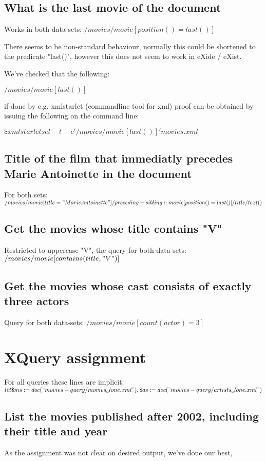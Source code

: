\subsection{What is the last movie of the document}
Works in both data-sets:
$/movies/movie[position()=last()]$

There seems to be non-standard behaviour, normally this could be
shortened to the predicate "last()", however this does not seem to
work in eXide / eXist. 

We've checked that the following: 

$/movies/movie[last()]$

if done by e.g. xmlstarlet (commandline tool for xml) proof can be
obtained by issuing the following on the command line:

$\$ xmlstarlet sel -t -c '/movies/movie[last()]' movies.xml$


\subsection{Title of the film that immediatly precedes Marie
  Antoinette in the document}
For both sets:
$/movies/movie[title="Marie Antoinette"]/preceding-sibling::movie[position()=last()]/title/text()$

\subsection{Get the movies whose title contains "V"}
Restricted to uppercase "V", the query for both data-sets:
$/movies/movie[contains(title, "V")]$

\subsection{Get the movies whose cast consists of exactly three
  actors}
Query for both data-sets:
$/movies/movie[count(actor) = 3]$

\section{XQuery assignment}
For all queries these lines are implicit:
$let \$ms:=doc("movies-query/movies_alone.xml"),
\$as:=doc("movies-query/artists_alone.xml")
$
\subsection{List the movies published after 2002, including their
  title and year}
As the assignment was not clear on desired output, we've done our best,

